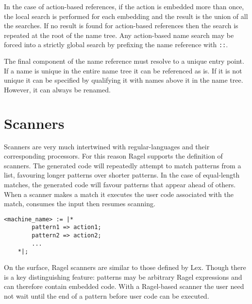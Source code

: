 \documentclass[letterpaper,11pt,oneside]{book}
\newcommand{\verbspace}{\vspace{10pt}}
\begin{document}
In the case of action-based references, if the action is embedded more than
once, the local search is performed for each embedding and the result is the
union of all the searches. If no result is found for action-based references then
the search is repeated at the root of the name tree.  Any action-based name
search may be forced into a strictly global search by prefixing the name
reference with \verb|::|.

The final component of the name reference must resolve to a unique entry point.
If a name is unique in the entire name tree it can be referenced as is. If it
is not unique it can be specified by qualifying it with names above it in the
name tree. However, it can always be renamed.



\section{Scanners}
\label{generating-scanners}

Scanners are very much intertwined with regular-languages and their
corresponding processors. For this reason Ragel supports the definition of
scanners.  The generated code will repeatedly attempt to match patterns from a
list, favouring longer patterns over shorter patterns.  In the case of
equal-length matches, the generated code will favour patterns that appear ahead
of others. When a scanner makes a match it executes the user code associated
with the match, consumes the input then resumes scanning.

\begin{verbatim}
<machine_name> := |* 
        pattern1 => action1;
        pattern2 => action2;
        ...
    *|;
\end{verbatim}
\verbspace

On the surface, Ragel scanners are similar to those defined by Lex. Though
there is a key distinguishing feature: patterns may be arbitrary Ragel
expressions and can therefore contain embedded code. With a Ragel-based scanner
the user need not wait until the end of a pattern before user code can be
executed.
\end{document}
